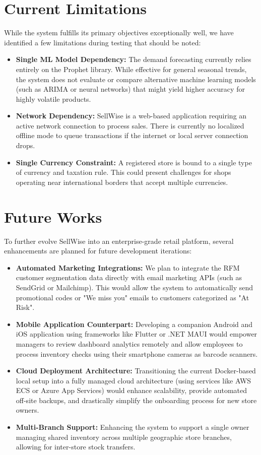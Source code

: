 \documentclass[12pt,a4paper]{report}
\begin{document}
\section{Current Limitations}
While the system fulfills its primary objectives exceptionally well, we have identified a few limitations during testing that should be noted:
\begin{itemize}
    \item \textbf{Single ML Model Dependency:} The demand forecasting currently relies entirely on the Prophet library. While effective for general seasonal trends, the system does not evaluate or compare alternative machine learning models (such as ARIMA or neural networks) that might yield higher accuracy for highly volatile products.
    \item \textbf{Network Dependency:} SellWise is a web-based application requiring an active network connection to process sales. There is currently no localized offline mode to queue transactions if the internet or local server connection drops.
    \item \textbf{Single Currency Constraint:} A registered store is bound to a single type of currency and taxation rule. This could present challenges for shops operating near international borders that accept multiple currencies.
\end{itemize}

\section{Future Works}
To further evolve SellWise into an enterprise-grade retail platform, several enhancements are planned for future development iterations:
\begin{itemize}
    \item \textbf{Automated Marketing Integrations:} We plan to integrate the RFM customer segmentation data directly with email marketing APIs (such as SendGrid or Mailchimp). This would allow the system to automatically send promotional codes or "We miss you" emails to customers categorized as "At Risk".
    \item \textbf{Mobile Application Counterpart:} Developing a companion Android and iOS application using frameworks like Flutter or .NET MAUI would empower managers to review dashboard analytics remotely and allow employees to process inventory checks using their smartphone cameras as barcode scanners.
    \item \textbf{Cloud Deployment Architecture:} Transitioning the current Docker-based local setup into a fully managed cloud architecture (using services like AWS ECS or Azure App Services) would enhance scalability, provide automated off-site backups, and drastically simplify the onboarding process for new store owners.
    \item \textbf{Multi-Branch Support:} Enhancing the system to support a single owner managing shared inventory across multiple geographic store branches, allowing for inter-store stock transfers.
\end{itemize}
\end{document}
